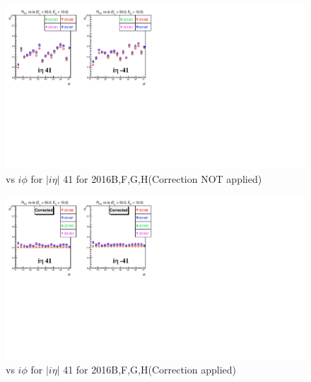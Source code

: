 \newpage
\begin{figure}[h!]
\centering
\includegraphics[width=0.99\linewidth]{../Figures/Chap2/ImageFiles_HF/Ratio/2016/Corrected/ieta41_E1E2Cut3Ietaiphi}
\caption{\ratiosl vs $i\phi$ for $|i\eta|$ 41 for 2016B,F,G,H(Correction NOT applied)}
\label{fig:ieta41_E1E2Cut3Ietaiphi}
\end{figure}
\begin{figure}[h!]
\centering
\includegraphics[width=0.99\linewidth]{../Figures/Chap2/ImageFiles_HF/Ratio/2016/Corrected/ieta41_E1E2Cut3Ietaiphi_Crrtd}
\caption{\ratiosl vs $i\phi$ for $|i\eta|$ 41 for 2016B,F,G,H(Correction applied)}
\label{fig:ieta41_E1E2Cut3Ietaiphi_Crrtd}
\end{figure}

